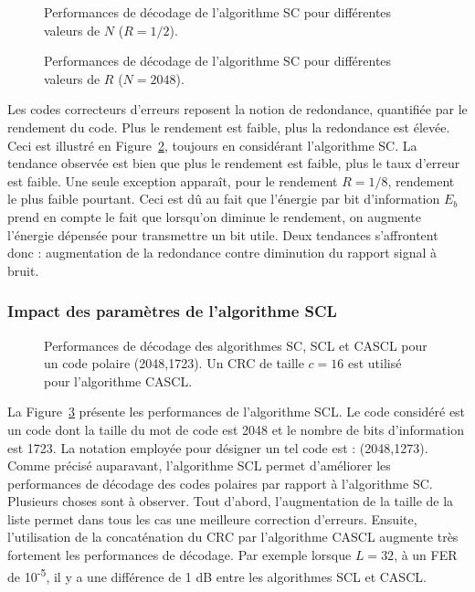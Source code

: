 \begin{figure}[h]
  \centering

\caption{Performances de décodage de l'algorithme SC pour différentes valeurs de $N$ ($R=1/2$).}
\label{fig:sc_n}
\end{figure}

\begin{figure}[h]
  \centering

\caption{Performances de décodage de l'algorithme SC pour différentes valeurs de $R$ ($N=2048$).}
\label{fig:sc_r}
\end{figure}
\clearpage
Les codes correcteurs d'erreurs reposent la notion de redondance, quantifiée par le rendement du code. Plus le rendement est faible, plus la redondance est élevée.
Ceci est illustré en Figure~\ref{fig:sc_r}, toujours en considérant l'algorithme SC. La tendance observée est bien que plus le rendement est faible, plus le taux d'erreur est faible.
Une seule exception apparaît, pour le rendement $R=1/8$, rendement le plus faible pourtant. Ceci est dû au fait que l'énergie par bit d'information $E_b$ prend en compte le fait que lorsqu'on diminue le rendement, on augmente l'énergie dépensée pour transmettre un bit utile. Deux tendances s'affrontent donc : augmentation de la redondance contre diminution du rapport signal à bruit.

\subsubsection{Impact des paramètres de l'algorithme SCL}

\begin{figure}[t]
  \centering
  
  \caption{Performances de décodage des algorithmes SC, SCL et CASCL pour un code polaire (2048,1723). Un CRC de taille $c=16$ est utilisé pour l'algorithme CASCL.}
  \label{fig:scl_l}
\end{figure}
La Figure~\ref{fig:scl_l} présente les performances de l'algorithme SCL. Le code considéré est un code dont la taille du mot de code est 2048 et le nombre de bits d'information est 1723. La notation employée pour désigner un tel code est : (2048,1273). Comme précisé auparavant, l'algorithme SCL permet d'améliorer les performances de décodage des codes polaires par rapport à l'algorithme SC.
Plusieurs choses sont à observer. Tout d'abord, l'augmentation de la taille de la liste permet dans tous les cas une meilleure correction d'erreurs. Ensuite, l'utilisation de la concaténation du CRC par l'algorithme CASCL augmente très fortement les performances de décodage. Par exemple lorsque $L=32$, à un FER de 10\textsuperscript{-5}, il y a une différence de 1 dB entre les algorithmes SCL et CASCL.

